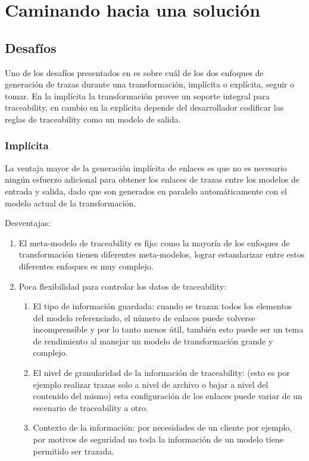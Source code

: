 \documentclass[a4paper,12pt,oneside]{book}
\begin{document}
\chapter{Caminando hacia una solución}

\section{Desafíos}

Uno de los desafíos presentados en \cite{GrammelVoigt} es sobre cuál de los dos enfoques de generación de trazas durante una transformación, implícita o explícita, seguir o tomar. En la implícita la transformación provee un soporte integral para traceability, en cambio en la explícita depende del desarrollador codificar las reglas de traceability como un modelo de salida.

\subsection{Implícita}

La ventaja mayor de la generación implícita de enlaces es que no es necesario ningún esfuerzo adicional para obtener los enlaces de trazas entre los modelos de entrada y salida, dado que son generados en paralelo automáticamente con el modelo actual de la transformación.

Desventajas:

\begin{enumerate}
\item     El meta-modelo de traceability es fijo: como la mayoría de los enfoques de transformación tienen diferentes meta-modelos, lograr estandarizar entre estos diferentes enfoques es muy complejo.
\item    Poca flexibilidad para controlar los datos de traceability:
\begin{enumerate}
\item         El tipo de información guardada: cuando se trazan todos los elementos del modelo referenciado, el número de enlaces puede volverse incomprensible y por lo tanto menos útil, también esto puede ser un tema de rendimiento al manejar un modelo de transformación grande y complejo.
\item        El nivel de granularidad de la información de traceability: (esto es por ejemplo realizar trazas solo a nivel de archivo o bajar a nivel del contenido del mismo) esta configuración de los enlaces puede variar de un escenario de traceability a otro.
\item       Contexto de la información: por necesidades de un cliente por ejemplo, por motivos de seguridad no toda la información de un modelo tiene permitido ser trazada.
\end{enumerate}
\end{enumerate}
\end{document}
